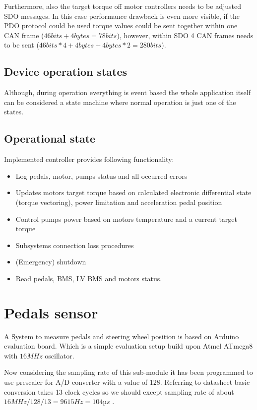 Furthermore, also the target torque off motor controllers needs to be adjusted SDO messages. In this case performance drawback is even more visible, if the PDO protocol could be used torque values could be sent together within one CAN frame ($46bits+4bytes=78 bits$), however, within SDO 4 CAN frames needs to be sent ($46bits*4+4bytes+4bytes*2=280bits$).

\subsection{Device operation states}
Although, during operation everything is event based the whole application itself can be considered a state machine where normal operation is just one of the states.


\subsection{Operational state}
Implemented controller provides following functionality:
\begin{itemize}
    \item Log pedals, motor, pumps status and all occurred errors
    \item Updates motors target torque based on calculated electronic differential state (torque vectoring), power limitation and acceleration pedal position
    \item Control pumps power based on motors temperature and a current target torque
    \item Subsystems connection loss procedures
    \item (Emergency) shutdown
    \item Read pedals, BMS, LV BMS and motors status.
\end{itemize}


\section{Pedals sensor}
A System to measure pedals and steering wheel position is based on Arduino evaluation board. Which is a simple evaluation setup build upon Atmel ATmega8 with $16MHz$ oscillator.

Now considering the sampling rate of this sub-module it has been programmed to use prescaler for A/D converter with a value of 128. Referring to datasheet basic conversion takes 13 clock cycles so we should except sampling rate of about $16MHz/128/13 = 9615Hz = 104µs$ \cite{Atmega8}.

